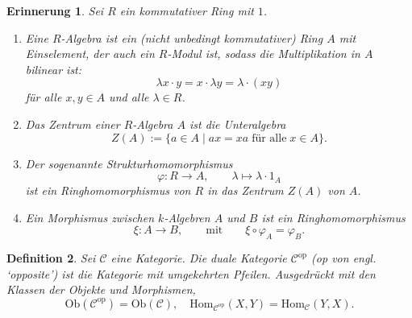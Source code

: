 \documentclass[a4paper, 11pt]{scrartcl}
\newcommand{\Hom}{\text{Hom}}
\newcommand{\Ob}{\text{Ob}}
\theoremstyle{basicstyle}
\newtheorem{definition}{Definition}[section]
\newtheorem{erinnerung}[definition]{Erinnerung}
\begin{document}
    \begin{erinnerung}
        Sei \(R\) ein kommutativer Ring mit \(1\).
        \begin{enumerate}
            \item Eine \emph{\(R\)-Algebra} ist ein (nicht unbedingt kommutativer) Ring \(A\) mit Einselement, der auch ein \(R\)-Modul ist, sodass die Multiplikation in \(A\) bilinear ist:
                \[\lambda x \cdot y = x \cdot \lambda y = \lambda \cdot (xy)\]
                für alle \(x,y \in A\) und alle \(\lambda \in R\).

            \item Das \emph{Zentrum} einer \(R\)-Algebra \(A\) ist die Unteralgebra
                \[Z(A) := \{a \in A \;\vert\; ax = xa \; \text{für alle} \; x \in A\}.\]

            \item Der sogenannte \emph{Strukturhomomorphismus} 
                \[\varphi: R \longrightarrow A, \qquad \lambda \mapsto \lambda \cdot 1_A\]
                ist ein Ringhomomorphismus von \(R\) in das Zentrum \(Z(A)\) von \(A\).

            \item Ein Morphismus zwischen \(k\)-Algebren \(A\) und \(B\) ist ein Ringhomomorphismus
                \[\xi: A \longrightarrow B, \qquad\text{mit}\qquad \xi \circ \varphi_A = \varphi_B.\]
        \end{enumerate}
    \end{erinnerung}

    \begin{definition}
        Sei \(\mathcal{C}\) eine Kategorie.
        Die \emph{duale Kategorie} \(\mathcal{C}^{\text{op}}\) (op von engl. `opposite') ist die Kategorie mit umgekehrten Pfeilen.
        Ausgedrückt mit den Klassen der Objekte und Morphismen,
        \[\Ob(\mathcal{C}^{\text{op}}) = \Ob(\mathcal{C}), \quad \Hom_{\mathcal{C}^{\text{op}}}(X, Y) = \Hom_{\mathcal{C}}(Y, X).\]
    \end{definition}
\end{document}
